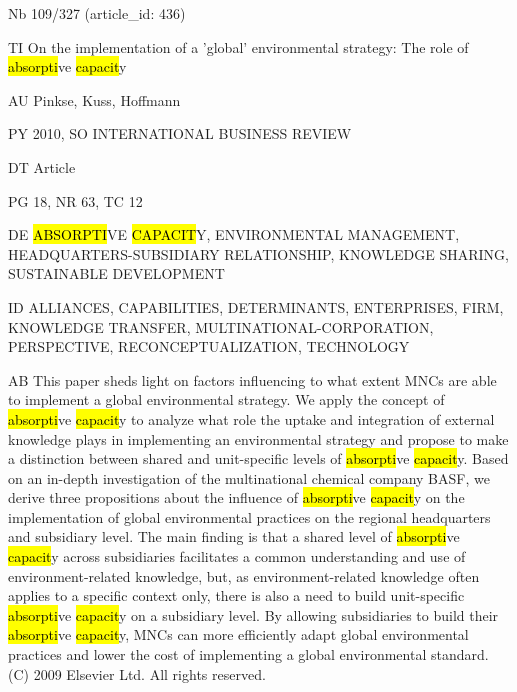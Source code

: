 \documentclass[a4paper]{article}
\begin{document}
\vspace*{-2cm}
Nb \tabto{0cm}109/327 (article\_id: 436)\par
TI \tabto{0cm}On the implementation of a 'global' environmental strategy: The role of \hl{absorpti}ve \hl{capacit}y\par
AU \tabto{0cm}Pinkse, Kuss, Hoffmann\par
PY \tabto{0cm}2010, SO INTERNATIONAL BUSINESS REVIEW\par
DT \tabto{0cm}Article\par
PG \tabto{0cm}18, NR 63, TC 12\par
DE \tabto{0cm}\hl{ABSORPTI}VE \hl{CAPACIT}Y, ENVIRONMENTAL MANAGEMENT, HEADQUARTERS-SUBSIDIARY RELATIONSHIP, KNOWLEDGE SHARING, SUSTAINABLE DEVELOPMENT\par
ID \tabto{0cm}ALLIANCES, CAPABILITIES, DETERMINANTS, ENTERPRISES, FIRM, KNOWLEDGE TRANSFER, MULTINATIONAL-CORPORATION, PERSPECTIVE, RECONCEPTUALIZATION, TECHNOLOGY\par
AB \tabto{0cm}This paper sheds light on factors influencing to what extent MNCs are able to implement a global environmental strategy. We apply the concept of \hl{absorpti}ve \hl{capacit}y to analyze what role the uptake and integration of external knowledge plays in implementing an environmental strategy and propose to make a distinction between shared and unit-specific levels of \hl{absorpti}ve \hl{capacit}y. Based on an in-depth investigation of the multinational chemical company BASF, we derive three propositions about the influence of \hl{absorpti}ve \hl{capacit}y on the implementation of global environmental practices on the regional headquarters and subsidiary level. The main finding is that a shared level of \hl{absorpti}ve \hl{capacit}y across subsidiaries facilitates a common understanding and use of environment-related knowledge, but, as environment-related knowledge often applies to a specific context only, there is also a need to build unit-specific \hl{absorpti}ve \hl{capacit}y on a subsidiary level. By allowing subsidiaries to build their \hl{absorpti}ve \hl{capacit}y, MNCs can more efficiently adapt global environmental practices and lower the cost of implementing a global environmental standard. (C) 2009 Elsevier Ltd. All rights reserved.\par
\clearpage
\end{document}
